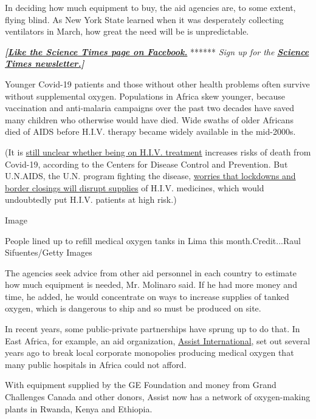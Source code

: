 In deciding how much equipment to buy, the aid agencies are, to some
extent, flying blind. As New York State learned when it was desperately
collecting ventilators in March, how great the need will be is
unpredictable.

\textbf{\emph{{[}}\href{http://on.fb.me/1paTQ1h}{\emph{Like the Science
Times page on Facebook.}}} ****** \emph{\textbar{} Sign up for the}
\textbf{\href{http://nyti.ms/1MbHaRU}{\emph{Science Times
newsletter.}}\emph{{]}}}

Younger Covid-19 patients and those without other health problems often
survive without supplemental oxygen. Populations in Africa skew younger,
because vaccination and anti-malaria campaigns over the past two decades
have saved many children who otherwise would have died. Wide swaths of
older Africans died of AIDS before H.I.V. therapy became widely
available in the mid-2000s.

(It is
\href{https://www.hiv.gov/hiv-basics/staying-in-hiv-care/other-related-health-issues/coronavirus-covid-19}{still
unclear whether being on H.I.V. treatment} increases risks of death from
Covid-19, according to the Centers for Disease Control and Prevention.
But U.N.AIDS, the U.N. program fighting the disease,
\href{https://www.voanews.com/science-health/un-warns-risk-low-distribution-aids-drug-amid-covid-lockdowns}{worries
that lockdowns and border closings will disrupt supplies} of H.I.V.
medicines, which would undoubtedly put H.I.V. patients at high risk.)

Image

People lined up to refill medical oxygen tanks in Lima this
month.Credit...Raul Sifuentes/Getty Images

The agencies seek advice from other aid personnel in each country to
estimate how much equipment is needed, Mr. Molinaro said. If he had more
money and time, he added, he would concentrate on ways to increase
supplies of tanked oxygen, which is dangerous to ship and so must be
produced on site.

In recent years, some public-private partnerships have sprung up to do
that. In East Africa, for example, an aid organization,
\href{https://assistinternational.org/global-health/access-to-oxygen/}{Assist
International}, set out several years ago to break local corporate
monopolies producing medical oxygen that many public hospitals in Africa
could not afford.

With equipment supplied by the GE Foundation and money from Grand
Challenges Canada and other donors, Assist now has a network of
oxygen-making plants in Rwanda, Kenya and Ethiopia.

